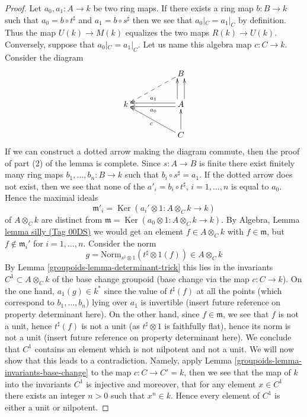 \documentclass{amsart}
\theoremstyle{plain}
\theoremstyle{definition}
\theoremstyle{remark}
\numberwithin{equation}{subsection}
\def\Ker{\mathop{\mathrm{Ker}}}
\begin{document}
\begin{proof}
\medskip\noindent
Let $a_0, a_1 : A \to k$ be two ring maps. If there exists a ring map
$b : B \to k$ such that $a_0 = b \circ t^\sharp$ and $a_1 = b \circ s^\sharp$
then we see that $a_0|_C = a_1|_C$ by definition. Thus the map
$U(k) \to M(k)$ equalizes the two maps $R(k) \to U(k)$.
Conversely, suppose that $a_0|_C = a_1|_C$. Let us name this algebra
map $c : C \to k$. Consider the diagram
$$
\xymatrix{
& &
B \ar@{-->}[lld] \\
k & &
A
\ar@<0.5ex>[ll]^{a_0}
\ar@<-0.5ex>[ll]_{a_1}
\ar@<1ex>[u]
\ar@<-1ex>[u] \\
& &
C \ar[u] \ar[llu]^c
}
$$
If we can construct a dotted arrow making the diagram commute, then
the proof of part (2) of the lemma is complete. Since $s : A \to B$ is finite
there exist finitely many ring maps
$b_1, \ldots, b_n : B \to k$ such that $b_i \circ s^\sharp = a_1$.
If the dotted arrow does not exist, then we see that none of the
$a'_i = b_i \circ t^\sharp$, $i = 1, \ldots, n$ is equal to $a_0$.
Hence the maximal ideals
$$
\mathfrak m'_i = \Ker(a_i' \otimes 1 : A \otimes_C k \to k)
$$
of $A \otimes_C k$ are distinct from
$\mathfrak m = \Ker(a_0 \otimes 1 : A \otimes_C k \to k)$.
By Algebra, Lemma \href{https://stacks.math.columbia.edu/tag/00DS}{lemma silly (Tag 00DS)} we would get an element
$f \in A \otimes_C k$ with $f \in \mathfrak m$, but
$f \not \in \mathfrak m_i'$ for $i = 1, \ldots, n$.
Consider the norm
$$
g = \text{Norm}_{s^\sharp \otimes 1}(t^\sharp \otimes 1(f))
\in
A \otimes_C k
$$
By Lemma \ref{groupoids-lemma-determinant-trick} this lies in the invariants
$C^1 \subset A \otimes_C k$ of the base change
groupoid (base change via the map $c : C \to k$). On the one hand,
$a_1(g) \in k^*$ since
the value of $t^\sharp(f)$ at all the points (which correspond to
$b_1, \ldots, b_n$) lying over $a_1$ is
invertible (insert future reference on property determinant here).
On the other hand, since $f \in \mathfrak m$, we see that
$f$ is not a unit, hence $t^\sharp(f)$ is not a unit
(as $t^\sharp \otimes 1$ is faithfully flat),
hence its norm is not a unit (insert future reference
on property determinant here). We conclude that $C^1$ contains
an element which is not nilpotent
and not a unit. We will now show that this leads to a contradiction.
Namely, apply Lemma \ref{groupoids-lemma-invariants-base-change}
to the map $c : C \to C' = k$, then
we see that the map of $k$ into the invariants $C^1$ is injective
and moreover, that for any element $x \in C^1$ there exists an integer
$n > 0$ such that $x^n \in k$. Hence every element of $C^1$ is
either a unit or nilpotent.


\end{proof}
\end{document}
